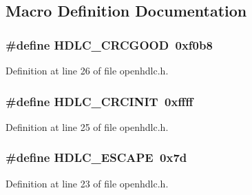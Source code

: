 \subsection{Macro Definition Documentation}
\subsubsection[{\texorpdfstring{H\+D\+L\+C\+\_\+\+C\+R\+C\+G\+O\+OD}{HDLC_CRCGOOD}}]{\setlength{\rightskip}{0pt plus 5cm}\#define H\+D\+L\+C\+\_\+\+C\+R\+C\+G\+O\+OD~0xf0b8}\hypertarget{group___h_d_l_c_gaa5c49016c845b86719f3cf78b851bb11}{}\label{group___h_d_l_c_gaa5c49016c845b86719f3cf78b851bb11}


Definition at line 26 of file openhdlc.\+h.

\subsubsection[{\texorpdfstring{H\+D\+L\+C\+\_\+\+C\+R\+C\+I\+N\+IT}{HDLC_CRCINIT}}]{\setlength{\rightskip}{0pt plus 5cm}\#define H\+D\+L\+C\+\_\+\+C\+R\+C\+I\+N\+IT~0xffff}\hypertarget{group___h_d_l_c_gac6338106c1e01eed6ade73fe14f318ed}{}\label{group___h_d_l_c_gac6338106c1e01eed6ade73fe14f318ed}


Definition at line 25 of file openhdlc.\+h.

\subsubsection[{\texorpdfstring{H\+D\+L\+C\+\_\+\+E\+S\+C\+A\+PE}{HDLC_ESCAPE}}]{\setlength{\rightskip}{0pt plus 5cm}\#define H\+D\+L\+C\+\_\+\+E\+S\+C\+A\+PE~0x7d}\hypertarget{group___h_d_l_c_ga8a4ca60e37719a6f32b08305b1fd8db0}{}\label{group___h_d_l_c_ga8a4ca60e37719a6f32b08305b1fd8db0}


Definition at line 23 of file openhdlc.\+h.

